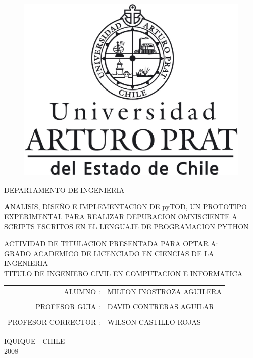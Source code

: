 \thispagestyle{empty}
\begin{singlespace}
\begin{figure}[hpb]
	\centering
	\includegraphics[scale=0.15]{images/logo.eps}
\end{figure}
\begin{center}

\vspace{-0.7cm}
DEPARTAMENTO DE INGENIERIA\\[4cm]

\begin{doublespace}
{\textbf ANALISIS, DISEÑO E IMPLEMENTACION DE pyTOD, UN PROTOTIPO EXPERIMENTAL PARA REALIZAR DEPURACION OMNISCIENTE A SCRIPTS ESCRITOS EN EL LENGUAJE DE PROGRAMACION PYTHON}\\[3cm]
\end{doublespace}
{\small ACTIVIDAD DE TITULACION PRESENTADA PARA OPTAR A:\\
GRADO ACADEMICO DE LICENCIADO EN CIENCIAS DE LA INGENIERIA\\
TITULO DE INGENIERO CIVIL EN COMPUTACION E INFORMATICA}\\[3cm]

\begin{table}[!h]
\begin{tabular}{r l}
{\small ALUMNO :} & {\small MILTON INOSTROZA AGUILERA}\\
\\
{\small PROFESOR GUIA :} & {\small DAVID CONTRERAS AGUILAR}\\
\\
{\small PROFESOR CORRECTOR :} & {\small WILSON CASTILLO ROJAS}\\
\end{tabular}
\end{table}
\vspace{5cm}
IQUIQUE - CHILE\\
2008
\end{center}
\end{singlespace}